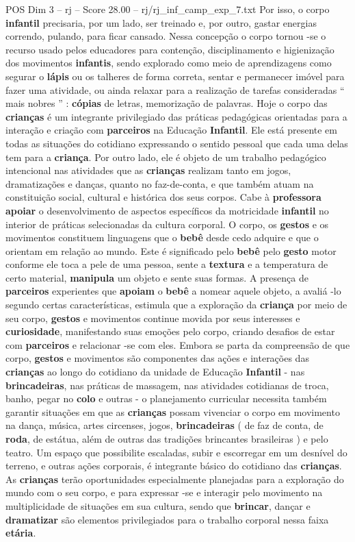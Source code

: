 \begin{textsample}{POS Dim 3 – rj – Score 28.00 – rj/rj\_inf\_camp\_exp\_7.txt}
Por isso, o corpo \textbf{infantil} precisaria, por um lado, ser treinado e, por outro, gastar energias correndo, pulando, para ficar cansado.
Nessa concepção o corpo tornou -se o recurso usado pelos educadores para contenção, disciplinamento e higienização dos movimentos \textbf{infantis}, sendo explorado como meio de aprendizagens como segurar o \textbf{lápis} ou os talheres de forma correta, sentar e permanecer imóvel para fazer uma atividade, ou ainda relaxar para a realização de tarefas consideradas “ mais nobres ” : \textbf{cópias} de letras, memorização de palavras.
Hoje o corpo das \textbf{crianças} é um integrante privilegiado das práticas pedagógicas orientadas para a interação e criação com \textbf{parceiros} na Educação \textbf{Infantil}.
Ele está presente em todas as situações do cotidiano expressando o sentido pessoal que cada uma delas tem para a \textbf{criança}.
Por outro lado, ele é objeto de um trabalho pedagógico intencional nas atividades que as \textbf{crianças} realizam tanto em jogos, dramatizações e danças, quanto no faz-de-conta, e que também atuam na constituição social, cultural e histórica dos seus corpos.
Cabe à \textbf{professora} \textbf{apoiar} o desenvolvimento de aspectos específicos da motricidade \textbf{infantil} no interior de práticas selecionadas da cultura corporal.
O corpo, os \textbf{gestos} e os movimentos constituem linguagens que o \textbf{bebê} desde cedo adquire e que o orientam em relação ao mundo.
Este é significado pelo \textbf{bebê} pelo \textbf{gesto} motor conforme ele toca a pele de uma pessoa, sente a \textbf{textura} e a temperatura de certo material, \textbf{manipula} um objeto e sente suas formas.
A presença de \textbf{parceiros} experientes que \textbf{apoiam} o \textbf{bebê} a nomear aquele objeto, a avaliá -lo segundo certas características, estimula que a exploração da \textbf{criança} por meio de seu corpo, \textbf{gestos} e movimentos continue movida por seus interesses e \textbf{curiosidade}, manifestando suas emoções pelo corpo, criando desafios de estar com \textbf{parceiros} e relacionar -se com eles.
Embora se parta da compreensão de que corpo, \textbf{gestos} e movimentos são componentes das ações e interações das \textbf{crianças} ao longo do cotidiano da unidade de Educação \textbf{Infantil} - nas \textbf{brincadeiras}, nas práticas de massagem, nas atividades cotidianas de troca, banho, pegar no \textbf{colo} e outras - o planejamento curricular necessita também garantir situações em que as \textbf{crianças} possam vivenciar o corpo em movimento na dança, música, artes circenses, jogos, \textbf{brincadeiras} ( de faz de conta, de \textbf{roda}, de estátua, além de outras das tradições brincantes brasileiras ) e pelo teatro.
Um espaço que possibilite escaladas, subir e escorregar em um desnível do terreno, e outras ações corporais, é integrante básico do cotidiano das \textbf{crianças}.
As \textbf{crianças} terão oportunidades especialmente planejadas para a exploração do mundo com o seu corpo, e para expressar -se e interagir pelo movimento na multiplicidade de situações em sua cultura, sendo que \textbf{brincar}, dançar e \textbf{dramatizar} são elementos privilegiados para o trabalho corporal nessa faixa \textbf{etária}.


\end{textsample}
